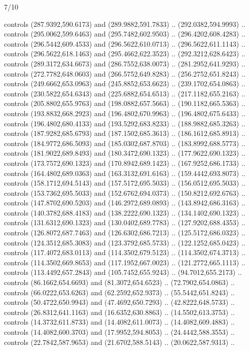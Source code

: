 \begin{flagdescription}{7/10}
\begin{scope}[xshift=0.5\flaglength]
\begin{scope}[scale=0.00185\flagwidth,yshift=245mm,xshift=-43.7mm]
\begin{scope}[y=-0.8pt, x=0.8pt, inner sep=0pt, outer sep=0pt]
  controls (287.9392,590.6173) and (289.9882,591.7833) .. (292.0382,594.9993) ..
  controls (295.0062,599.6463) and (295.7482,602.9503) .. (296.4202,608.4283) ..
  controls (296.5442,609.4533) and (296.5622,610.0713) .. (296.5622,611.1143) ..
  controls (296.5622,618.1463) and (295.4662,622.3523) .. (292.3212,628.6423) ..
  controls (289.3172,634.6673) and (286.7552,638.0073) .. (281.2952,641.9293) ..
  controls (272.7782,648.0603) and (266.5752,649.8283) .. (256.2752,651.8243) ..
  controls (249.6662,653.0963) and (245.8852,653.6623) .. (239.1702,654.0863) ..
  controls (230.5822,654.6343) and (225.6882,654.6513) .. (217.1182,655.2163) ..
  controls (205.8802,655.9763) and (198.0882,657.5663) .. (190.1182,665.5363) ..
  controls (193.8832,668.2923) and (196.4802,670.9963) .. (196.4802,675.6433) ..
  controls (196.4802,680.4133) and (193.5292,683.8233) .. (188.9882,685.3263) ..
  controls (187.9282,685.6793) and (187.1502,685.3613) .. (186.1612,685.8913) ..
  controls (184.9772,686.5093) and (185.0302,687.8703) .. (183.8992,688.5773) ..
  controls (181.9022,689.8493) and (180.3472,690.1323) .. (177.9622,690.1323) ..
  controls (173.7572,690.1323) and (170.8942,689.1423) .. (167.9252,686.1733) ..
  controls (164.4802,689.0363) and (163.3132,691.6163) .. (159.4442,693.8073) ..
  controls (158.1712,694.5143) and (157.5172,695.5033) .. (156.0512,695.5033) ..
  controls (153.7362,695.5033) and (152.6762,694.0373) .. (150.8212,692.6763) ..
  controls (147.8702,690.5203) and (146.2972,689.0893) .. (143.8942,686.3163) ..
  controls (140.3782,688.4183) and (138.2222,690.1323) .. (134.1402,690.1323) ..
  controls (131.6312,690.1323) and (130.0402,689.7783) .. (127.9202,688.4353) ..
  controls (126.8072,687.7463) and (126.6302,686.7213) .. (125.5172,686.0323) ..
  controls (124.3512,685.3083) and (123.3792,685.5733) .. (122.1252,685.0423) ..
  controls (117.4072,683.0113) and (114.3502,679.5123) .. (114.3502,674.3713) ..
  controls (114.3502,669.8653) and (117.1952,667.0023) .. (121.2772,665.1113) ..
  controls (113.4492,657.2843) and (105.7452,655.9243) .. (94.7012,655.2173) ..
  controls (86.1662,654.6693) and (81.3072,654.6523) .. (72.7902,654.0863) ..
  controls (66.0222,653.6263) and (62.2592,652.9373) .. (55.5442,651.8243) ..
  controls (50.4722,650.9943) and (47.4692,650.7293) .. (42.8222,648.5733) ..
  controls (26.8312,641.1163) and (16.6352,630.8863) .. (14.5502,613.3753) ..
  controls (14.3732,611.8733) and (14.4082,611.0073) .. (14.4082,609.4883) ..
  controls (14.4082,600.3703) and (17.9952,594.8053) .. (24.4442,588.3553) ..
  controls (22.7842,587.9653) and (21.6702,588.5143) .. (20.0622,587.9313) ..

\end{scope}
\end{scope}
\end{scope}
\end{flagdescription}
